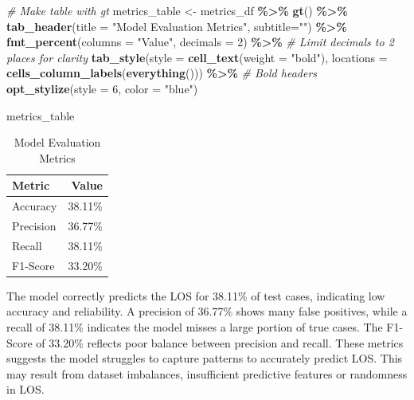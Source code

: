 \documentclass[
]{article}
\newenvironment{Shaded}{\begin{snugshade}}{\end{snugshade}}
\newcommand{\AttributeTok}[1]{\textcolor[rgb]{0.13,0.29,0.53}{#1}}
\newcommand{\CommentTok}[1]{\textcolor[rgb]{0.56,0.35,0.01}{\textit{#1}}}
\newcommand{\DecValTok}[1]{\textcolor[rgb]{0.00,0.00,0.81}{#1}}
\newcommand{\FunctionTok}[1]{\textcolor[rgb]{0.13,0.29,0.53}{\textbf{#1}}}
\newcommand{\NormalTok}[1]{#1}
\newcommand{\OtherTok}[1]{\textcolor[rgb]{0.56,0.35,0.01}{#1}}
\newcommand{\SpecialCharTok}[1]{\textcolor[rgb]{0.81,0.36,0.00}{\textbf{#1}}}
\newcommand{\StringTok}[1]{\textcolor[rgb]{0.31,0.60,0.02}{#1}}
\begin{document}
\begin{Shaded}
\begin{Highlighting}[]
\CommentTok{\# Make table with gt}
\NormalTok{metrics\_table }\OtherTok{\textless{}{-}}\NormalTok{ metrics\_df }\SpecialCharTok{\%\textgreater{}\%}
  \FunctionTok{gt}\NormalTok{() }\SpecialCharTok{\%\textgreater{}\%}
  \FunctionTok{tab\_header}\NormalTok{(}\AttributeTok{title =} \StringTok{"Model Evaluation Metrics"}\NormalTok{,}
             \AttributeTok{subtitle=}\StringTok{""}\NormalTok{) }\SpecialCharTok{\%\textgreater{}\%}
  \FunctionTok{fmt\_percent}\NormalTok{(}\AttributeTok{columns =} \StringTok{"Value"}\NormalTok{, }\AttributeTok{decimals =} \DecValTok{2}\NormalTok{) }\SpecialCharTok{\%\textgreater{}\%} \CommentTok{\# Limit decimals to 2 places for clarity}
  \FunctionTok{tab\_style}\NormalTok{(}\AttributeTok{style =} \FunctionTok{cell\_text}\NormalTok{(}\AttributeTok{weight =} \StringTok{"bold"}\NormalTok{), }\AttributeTok{locations =} \FunctionTok{cells\_column\_labels}\NormalTok{(}\FunctionTok{everything}\NormalTok{())) }\SpecialCharTok{\%\textgreater{}\%} \CommentTok{\# Bold headers}
  \FunctionTok{opt\_stylize}\NormalTok{(}\AttributeTok{style =} \DecValTok{6}\NormalTok{, }\AttributeTok{color =} \StringTok{"blue"}\NormalTok{)}

\NormalTok{metrics\_table}
\end{Highlighting}
\end{Shaded}

\begin{table}[!t]
\caption*{
{\large Model Evaluation Metrics}
} 
\fontsize{12.0pt}{14.4pt}\selectfont
\begin{tabular*}{\linewidth}{@{\extracolsep{\fill}}lr}
\toprule
{\bfseries Metric} & {\bfseries Value} \\ 
\midrule\addlinespace[2.5pt]
Accuracy & 38.11\% \\ 
Precision & 36.77\% \\ 
Recall & 38.11\% \\ 
F1-Score & 33.20\% \\ 
\bottomrule
\end{tabular*}
\end{table}

The model correctly predicts the LOS for 38.11\% of test cases,
indicating low accuracy and reliability. A precision of 36.77\% shows
many false positives, while a recall of 38.11\% indicates the model
misses a large portion of true cases. The F1-Score of 33.20\% reflects
poor balance between precision and recall. These metrics suggests the
model struggles to capture patterns to accurately predict LOS. This may
result from dataset imbalances, insufficient predictive features or
randomness in LOS.
\end{document}

